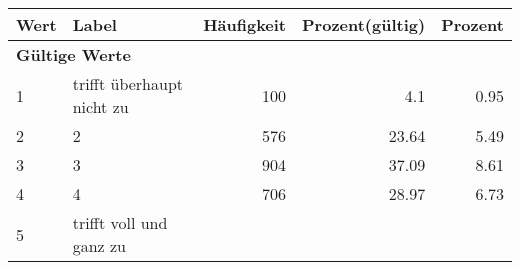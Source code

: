      \begin{longtable}{lXrrr}
     \toprule
     \textbf{Wert} & \textbf{Label} & \textbf{Häufigkeit} & \textbf{Prozent(gültig)} & \textbf{Prozent} \\
     \endhead
     \midrule
     \multicolumn{5}{l}{\textbf{Gültige Werte}}\\

     1 &
     \multicolumn{1}{X}{ trifft überhaupt nicht zu   } &


       \num{100} &
       \num[round-mode=places,round-precision=2]{4.1} &
         \num[round-mode=places,round-precision=2]{0.95} \\

     2 &
     \multicolumn{1}{X}{ 2   } &


       \num{576} &
       \num[round-mode=places,round-precision=2]{23.64} &
         \num[round-mode=places,round-precision=2]{5.49} \\

     3 &
     \multicolumn{1}{X}{ 3   } &


       \num{904} &
       \num[round-mode=places,round-precision=2]{37.09} &
         \num[round-mode=places,round-precision=2]{8.61} \\

     4 &
     \multicolumn{1}{X}{ 4   } &


       \num{706} &
       \num[round-mode=places,round-precision=2]{28.97} &
         \num[round-mode=places,round-precision=2]{6.73} \\

     5 &
     \multicolumn{1}{X}{ trifft voll und ganz zu   } &



\end{longtable}
